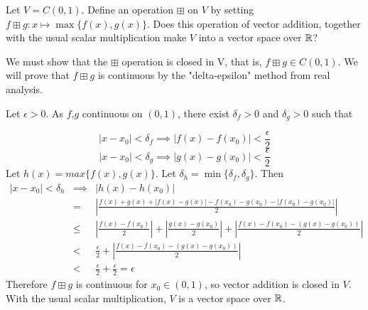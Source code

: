 \begin{problem}[Golan 60]

Let $V = C(0,1)$. Define an operation $\boxplus$ on $V$ by setting 
$f \boxplus g : x \mapsto \max \{f(x), g(x)\}$.  
Does this operation of vector addition, together with the usual scalar
multiplication make $V$ into a vector space over $\mathbb{R}$?

\end{problem}
\smallskip
\begin{solution}
We must show that the $\boxplus$ operation is closed in V, that is, $f \boxplus g \in C(0,1)$. We will prove that $f \boxplus g$ is continuous by the "delta-epsilon" method from real analysis. 

Let $\epsilon > 0$. As $f$,$g$ continuous on $(0,1)$, there exist $\delta_f > 0$ and $\delta_g > 0$ such that

$$ |x - x_0| < \delta_f \implies |f(x)-f(x_0)| < \frac{\epsilon}{2}$$ $$|x - x_0| < \delta_g \implies |g(x)-g(x_0)| < \frac{\epsilon}{2}$$
Let $h(x) = max\{f(x),g(x)\}$. Let $\delta_h = \min\{\delta_f,\delta_g\}$. Then
\begin{eqnarray*}
|x - x_0| < \delta_h & \implies & |h(x) - h(x_0)| \\ & = & \left|\frac{f(x)+g(x)+|f(x)-g(x)|-f(x_0)-g(x_0)-|f(x_0)-g(x_0)|}{2}\right| \\
& \leq & \left|\frac{f(x)-f(x_0)}{2}\right| + \left|\frac{g(x)-g(x_0)}{2}\right|
+ \left|\frac{f(x)-f(x_0)-(g(x)-g(x_0))}{2}\right| \\
& < & \frac{\epsilon}{2} + \left|\frac{f(x)-f(x_0)-(g(x)-g(x_0))}{2}\right| \\
& < & \frac{\epsilon}{2} + \frac{\epsilon}{2} = \epsilon
\end{eqnarray*}
Therefore $f \boxplus g$ is continuous for $x_0 \in (0,1)$, so vector addition is closed in $V$. With the usual scalar multiplication, $V$ is a vector space over $\mathbb{R}$.
\end{solution}
\probskip



